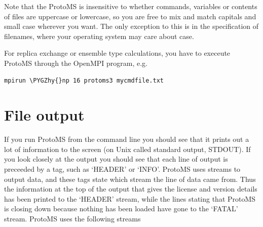 \documentclass[letterpaper,10pt,english]{sphinxmanual}
\def\PYGZhy{\char`\-}
\begin{document}
Note that the ProtoMS is insensitive to whether commands, variables or contents of files are uppercase or lowercase, so you are free to mix and match capitals and small case wherever you want. The only exception to this is in the specification of filenames, where your operating system may care about case.

For replica exchange or ensemble type calculations, you have to execeute ProtoMS through the OpenMPI program, e.g.

\begin{Verbatim}[commandchars=\\\{\}]
mpirun \PYGZhy{}np 16 protoms3 mycmdfile.txt
\end{Verbatim}


\section{File output}
\label{protoms:file-output}\label{protoms:index-27}
If you run ProtoMS from the command line you should see that it prints out a lot of information to the screen (on Unix called standard output, STDOUT). If you look closely at the output you should see that each line of output is preceeded by a tag, such as ‘HEADER’ or ‘INFO’. ProtoMS uses streams to output data, and these tags state which stream the line of data came from. Thus the information at the top of the output that gives the license and version details has been printed to the ‘HEADER’ stream, while the lines stating that ProtoMS is closing down because nothing has been loaded have gone to the ‘FATAL’ stream. ProtoMS uses the following streams
\end{document}
